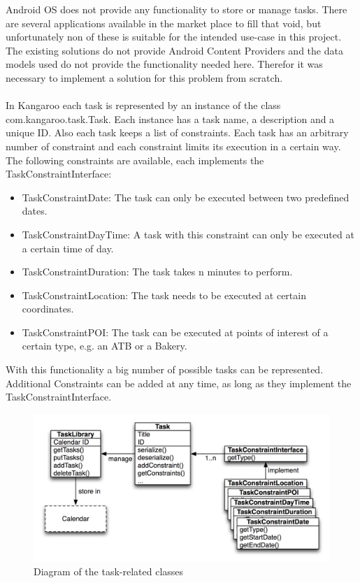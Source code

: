 Android OS does not provide any functionality to store or manage tasks. There are several applications available in the market place to fill that void, but unfortunately non of these is suitable for the intended use-case in this project.  The existing solutions do not provide Android Content Providers and the data models used do not provide the functionality needed here. Therefor it was necessary to implement a solution for this problem from scratch.\\\\
In Kangaroo each task is represented by an instance of the class com.kangaroo.task.Task. Each instance has a task name, a description and a unique ID. Also each task keeps a list of constraints. Each task has an arbitrary number of constraint and each constraint limits its execution in a certain way. The following constraints are available, each implements the TaskConstraintInterface:
\begin{itemize}
\item TaskConstraintDate: The task can only be executed between two predefined dates.
\item TaskConstraintDayTime: A task with this constraint can only be executed at a certain time of day.
\item TaskConstraintDuration: The task takes n minutes to perform.
\item TaskConstraintLocation: The task needs to be executed at certain coordinates.
\item TaskConstraintPOI: The task can be executed at points of interest of a certain type, e.g. an ATB or a Bakery.
\end{itemize}
With this functionality a big number of possible tasks can be represented. Additional Constraints can be added at any time, as long as they implement the TaskConstraintInterface.\\
\begin{figure}[h!]
\centering
\includegraphics[width=14cm]{pics/task_class.png}
\caption{Diagram of the task-related classes}
\label{task_class}
\end{figure}  
